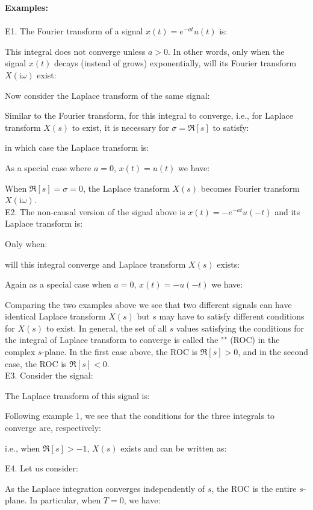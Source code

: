 	\begin{tcolorbox}[colframe=black,colback=white,sharp corners,breakable]
	\textbf{{\Large {}}Examples:}\\\\
	E1. The Fourier transform of a signal $x(t)=e^{-at}u(t)$ is:
	
	This integral does not converge unless $a>0$. In other words, only when the signal $x(t)$ decays (instead of grows) exponentially, will its Fourier transform $X(\mathrm{i}\omega)$ exist:
	
	Now consider the Laplace transform of the same signal:
	
	Similar to the Fourier transform, for this integral to converge, i.e., for Laplace transform $X(s)$ to exist, it is necessary for $\sigma=\Re[s]$ to satisfy:
	
	in which case the Laplace transform is:
	
	As a special case where $a=0$, $x(t)=u(t)$ we have:
	
	When $ \Re[s]=\sigma=0$, the Laplace transform $X(s)$ becomes Fourier transform $X(\mathrm{i}\omega)$. \\
	
	E2. The non-causal version of the signal above is $x(t)=-e^{-at}u(-t)$ and its Laplace transform is:
	
	Only when:
	
	will this integral converge and Laplace transform $X(s)$ exists:
	
	Again as a special case when $a=0$, $x(t)=-u(-t)$ we have:
	
	Comparing the two examples above we see that two different signals can have identical Laplace transform $X(s)$ but $s$ may have to satisfy different conditions for $X(s)$ to exist. In general, the set of all $s$ values satisfying the conditions for the integral of Laplace transform to converge is called the "" (ROC) in the complex $s$-plane. In the first case above, the ROC is $\Re[s]>0$, and in the second case, the ROC is $\Re[s]<0$.\\
	
	E3. Consider the signal:
	
	The Laplace transform of this signal is:
	
	Following example 1, we see that the conditions for the three integrals to converge are, respectively:
	
	i.e., when $\Re[s]>-1$, $X(s)$ exists and can be written as:
	
	E4. Let us consider:
	
	As the Laplace integration converges independently of $s$, the ROC is the entire $s$-plane. In particular, when $T=0$, we have:
	
	\end{tcolorbox}
